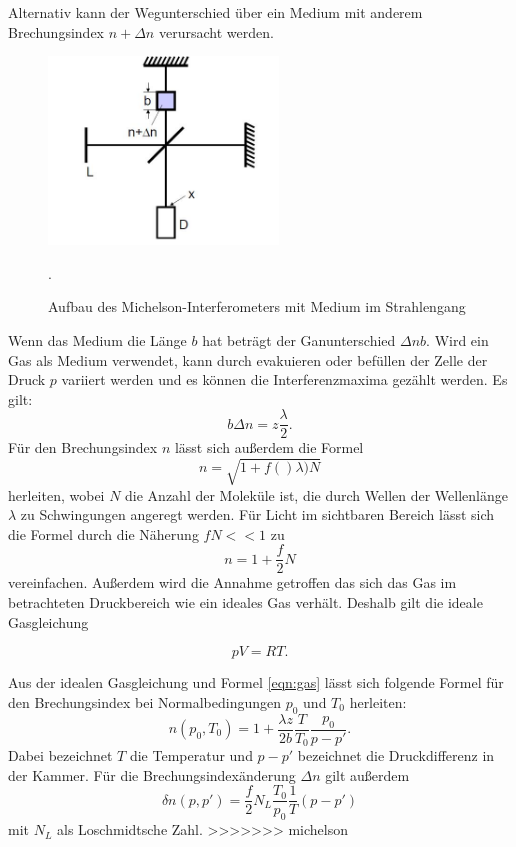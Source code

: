 Alternativ kann der Wegunterschied über ein Medium mit anderem Brechungsindex $n+\Delta n$
verursacht werden.
\begin{figure}[H]
  \centering
  \includegraphics[height=5cm]{gas.JPG}
  \caption{Aufbau des Michelson-Interferometers mit Medium im Strahlengang}
  \label{fig:gas}
  \cite{skript}.
\end{figure}

Wenn das Medium die Länge $b$ hat beträgt der Ganunterschied $\Delta nb$.
Wird ein Gas als Medium verwendet, kann durch evakuieren oder befüllen der Zelle der
Druck $p$ variiert werden und es können die Interferenzmaxima gezählt werden.
Es gilt:
\begin{equation}
  b\Delta n = z \frac{\lambda}{2}
  \label{eqn:gas}.
\end{equation}
Für den Brechungsindex $n$ lässt sich außerdem die Formel
\begin{equation}
  n=\sqrt{1+f()\lambda)N}
\end{equation}
herleiten, wobei $N$ die Anzahl der Moleküle ist, die durch Wellen der Wellenlänge
$\lambda$ zu Schwingungen angeregt werden. Für Licht im sichtbaren Bereich lässt
sich die Formel durch die Näherung $fN<<1$  zu
\begin{equation}
  n=1+\frac{f}{2}N
\end{equation}
vereinfachen.
Außerdem wird die Annahme getroffen das sich das Gas im betrachteten Druckbereich
wie ein ideales Gas verhält. Deshalb gilt die ideale Gasgleichung

\begin{equation}
  pV=RT.
\end{equation}

Aus der idealen Gasgleichung und Formel \ref{eqn:gas} lässt sich folgende Formel für
den Brechungsindex bei Normalbedingungen $p_{0}$ und $T_{0}$ herleiten:
\begin{equation}
  n(p_{0},T_{0})= 1+ \frac{\lambda z}{2b}\frac{T}{T_{0}}\frac{p_{0}}{p-p'}.
\end{equation}
Dabei bezeichnet $T$ die Temperatur und $p-p'$ bezeichnet die Druckdifferenz in der Kammer.
Für die Brechungsindexänderung $\Delta n$ gilt außerdem
\begin{equation}
  \delta n(p,p')= \frac{f}{2}N_{L}\frac{T_{0}}{p_{0}}\frac{1}{T}(p-p')
\end{equation}
mit $N_{L}$ als Loschmidtsche Zahl.
>>>>>>> michelson
